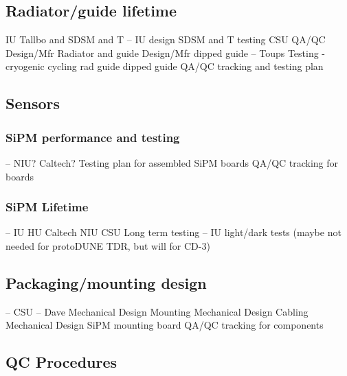 \subsection{Radiator/guide lifetime}
     IU Tallbo and SDSM and T  -- IU design SDSM and T testing  CSU QA/QC
     Design/Mfr Radiator and guide
     Design/Mfr dipped guide -- Toups
     Testing - cryogenic cycling 
          rad
          guide
          dipped guide
     QA/QC tracking and testing plan  

\subsection{Sensors}

\subsubsection{SiPM performance and testing}
      -- NIU? Caltech?
     Testing plan for assembled SiPM boards
     QA/QC tracking for boards     

\subsubsection{SiPM Lifetime}
      -- IU HU Caltech NIU CSU 
     Long term testing -- IU light/dark tests     
     (maybe not needed for protoDUNE TDR, but will for CD-3)


\subsection{Packaging/mounting design}
      -- CSU  -- Dave
     Mechanical Design Mounting 
     Mechanical Design Cabling
     Mechanical Design SiPM mounting board
     QA/QC tracking for components

\subsection{QC Procedures}



